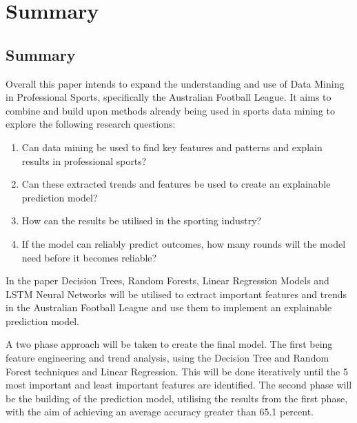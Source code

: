 \documentclass{imc-inf}
\begin{document}
	\newpage
	\chapter{Summary}\label{chap:summary}
	\section{Summary}
	Overall this paper intends to expand the understanding and use of Data Mining in Professional Sports, specifically the Australian Football League. It aims to combine and build upon methods already being used in sports data mining to explore the following research questions:
	\begin{enumerate}
		\item[] Can data mining be used to find key features and patterns and explain results in professional sports?
		\item[] Can these extracted trends and features be used to create an explainable prediction model?
		\item[] How can the results be utilised in the sporting industry?
		\item[] If the model can reliably predict outcomes, how many rounds will the model need before it becomes reliable?
	\end{enumerate}
	In the paper Decision Trees, Random Forests, Linear Regression Models and LSTM Neural Networks will be utilised to extract important features and trends in the Australian Football League and use them to implement an explainable prediction model.
	
	A two phase approach will be taken to create the final model. The first being feature engineering and trend analysis, using the Decision Tree and Random Forest techniques and Linear Regression. This will be done iteratively until the 5 most important and least important features are identified. The second phase will be the building of the prediction model, utilising the results from the first phase, with the aim of achieving an average accuracy greater than 65.1 percent.
	
	
	\newpage
	
	
\end{document}
